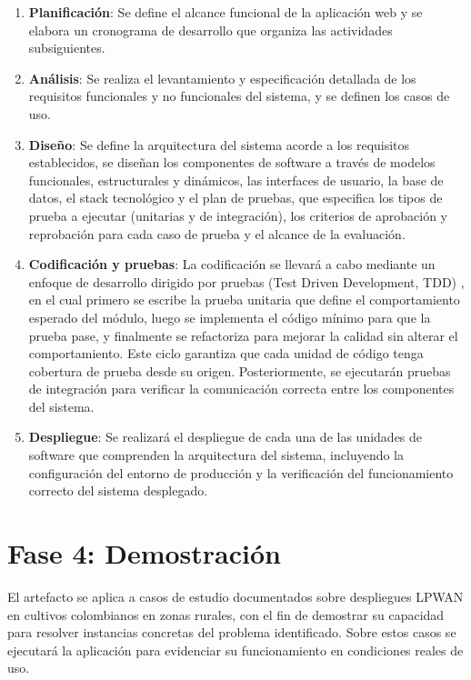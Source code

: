 \begin{enumerate}
      \item \textbf{Planificación}: Se define el alcance funcional de la
            aplicación web y se elabora un cronograma de desarrollo que organiza
            las actividades subsiguientes.

      \item \textbf{Análisis}: Se realiza el levantamiento y especificación
            detallada  de  los  requisitos  funcionales  y  no  funcionales  del
            sistema, y se definen los casos de uso.

      \item \textbf{Diseño}: Se define la arquitectura del sistema acorde a los
            requisitos establecidos, se diseñan los componentes  de  software  a
            través  de  modelos  funcionales,  estructurales  y  dinámicos,  las
            interfaces de usuario, la base de datos, el stack tecnológico  y  el
            plan de pruebas, que especifica  los  tipos  de  prueba  a  ejecutar
            (unitarias  y  de  integración),  los  criterios  de  aprobación   y
            reprobación para cada caso de prueba y el alcance de la evaluación.

      \item \textbf{Codificación y pruebas}: La codificación se llevará a cabo
            mediante un enfoque de desarrollo dirigido por pruebas (Test  Driven
            Development, TDD) \parencite{beck2004xp},  en  el  cual  primero  se
            escribe la prueba unitaria que define el comportamiento esperado del
            módulo, luego se implementa el código  mínimo  para  que  la  prueba
            pase, y finalmente  se  refactoriza  para  mejorar  la  calidad  sin
            alterar el comportamiento. Este ciclo garantiza que cada  unidad  de
            código tenga cobertura de prueba desde su origen. Posteriormente, se
            ejecutarán pruebas de integración  para  verificar  la  comunicación
            correcta entre los componentes del sistema.

      \item \textbf{Despliegue}: Se realizará el despliegue de cada una de las
            unidades de software que comprenden  la  arquitectura  del  sistema,
            incluyendo  la  configuración  del  entorno  de  producción   y   la
            verificación del funcionamiento correcto del sistema desplegado.
\end{enumerate}

\section{Fase 4: Demostración}  El  artefacto  se  aplica  a  casos  de  estudio
documentados sobre despliegues LPWAN en cultivos colombianos en  zonas  rurales,
con el fin de demostrar su capacidad  para  resolver  instancias  concretas  del
problema identificado.  Sobre  estos  casos  se  ejecutará  la  aplicación  para
evidenciar su funcionamiento en condiciones reales de uso.

